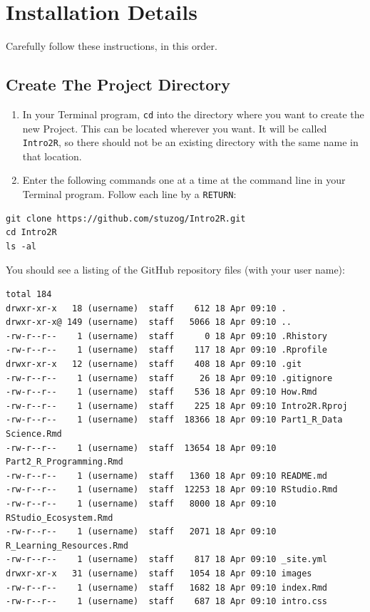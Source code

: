 \documentclass[]{book}
\theoremstyle{definition}
\theoremstyle{definition}
\theoremstyle{definition}
\theoremstyle{remark}
\begin{document}
\hypertarget{installation-details}{%
\section{Installation Details}\label{installation-details}}

Carefully follow these instructions, in this order.

\hypertarget{create-the-project-directory}{%
\subsection{Create The Project
Directory}\label{create-the-project-directory}}

\begin{enumerate}
\def\labelenumi{\arabic{enumi}.}
\item
  In your Terminal program, \texttt{cd} into the directory where you
  want to create the new Project. This can be located wherever you want.
  It will be called \texttt{Intro2R}, so there should not be an existing
  directory with the same name in that location.
\item
  Enter the following commands one at a time at the command line in your
  Terminal program. Follow each line by a \texttt{RETURN}:
\end{enumerate}

\begin{verbatim}
git clone https://github.com/stuzog/Intro2R.git
cd Intro2R
ls -al
\end{verbatim}

You should see a listing of the GitHub repository files (with your user
name):

\begin{verbatim}
total 184
drwxr-xr-x   18 (username)  staff    612 18 Apr 09:10 .
drwxr-xr-x@ 149 (username)  staff   5066 18 Apr 09:10 ..
-rw-r--r--    1 (username)  staff      0 18 Apr 09:10 .Rhistory
-rw-r--r--    1 (username)  staff    117 18 Apr 09:10 .Rprofile
drwxr-xr-x   12 (username)  staff    408 18 Apr 09:10 .git
-rw-r--r--    1 (username)  staff     26 18 Apr 09:10 .gitignore
-rw-r--r--    1 (username)  staff    536 18 Apr 09:10 How.Rmd
-rw-r--r--    1 (username)  staff    225 18 Apr 09:10 Intro2R.Rproj
-rw-r--r--    1 (username)  staff  18366 18 Apr 09:10 Part1_R_Data Science.Rmd
-rw-r--r--    1 (username)  staff  13654 18 Apr 09:10 Part2_R_Programming.Rmd
-rw-r--r--    1 (username)  staff   1360 18 Apr 09:10 README.md
-rw-r--r--    1 (username)  staff  12253 18 Apr 09:10 RStudio.Rmd
-rw-r--r--    1 (username)  staff   8000 18 Apr 09:10 RStudio_Ecosystem.Rmd
-rw-r--r--    1 (username)  staff   2071 18 Apr 09:10 R_Learning_Resources.Rmd
-rw-r--r--    1 (username)  staff    817 18 Apr 09:10 _site.yml
drwxr-xr-x   31 (username)  staff   1054 18 Apr 09:10 images
-rw-r--r--    1 (username)  staff   1682 18 Apr 09:10 index.Rmd
-rw-r--r--    1 (username)  staff    687 18 Apr 09:10 intro.css
\end{verbatim}
\end{document}
